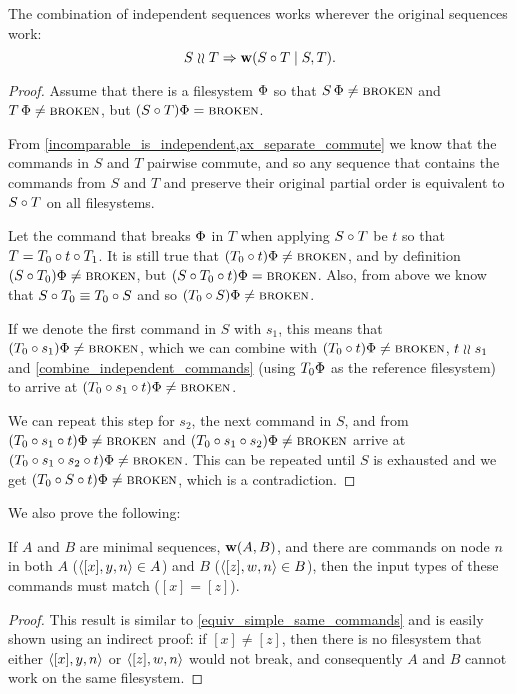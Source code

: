 \begin{mylem}\label{combine_independent_sequences}
The combination of independent sequences works wherever the original sequences work:
\[ S\mathrel{\wr\wr} T \Rightarrow \mathbf{w}({S\circ T}\mathrel{|}{S,T}). \]
\end{mylem}
\begin{proof}
Assume that there is a filesystem $\Phi$ so that
$S\,\Phi\neq\text{\normalfont\scshape{broken}}$ and $T\,\Phi\neq\text{\normalfont\scshape{broken}}$, but
$(S\circ T)\Phi=\text{\normalfont\scshape{broken}}$.

From \cref{incomparable_is_independent,ax_separate_commute} we know that
the commands in $S$ and $T$ pairwise commute, and so any sequence
that contains the commands from $S$ and $T$ and preserve their original partial order
is equivalent to $S\circ T$ on all filesystems.

Let the command that breaks $\Phi$ in $T$ when applying $S\circ T$ be $t$
so that $T=T_0\circ t\circ T_1$.
It is still true that $(T_0 \circ t)\Phi\neq\text{\normalfont\scshape{broken}}$,
and by definition $(S\circ T_0)\Phi\neq\text{\normalfont\scshape{broken}}$,
but $(S\circ T_0\circ t)\Phi=\text{\normalfont\scshape{broken}}$.
Also, from above we know that $S\circ T_0\equiv T_0\circ S$
and so $(T_0 \circ S)\Phi\neq\text{\normalfont\scshape{broken}}$.

If we denote the first command in $S$ with $s_1$,
this means that $(T_0 \circ s_1)\Phi\neq\text{\normalfont\scshape{broken}}$,
which we can combine with $(T_0 \circ t)\Phi\neq\text{\normalfont\scshape{broken}}$, $t\mathrel{\wr\wr} s_1$ and
\cref{combine_independent_commands}
(using $T_0\Phi$ as the reference filesystem)
to arrive at $(T_0 \circ s_1\circ t)\Phi\neq\text{\normalfont\scshape{broken}}$.

We can repeat this step for $s_2$, the next command in $S$,
and from 
$(T_0 \circ s_1\circ t)\Phi\neq\text{\normalfont\scshape{broken}}$
and
$(T_0 \circ s_1\circ s_2)\Phi\neq\text{\normalfont\scshape{broken}}$
arrive at
$(T_0 \circ s_1\circ s_2\circ t)\Phi\neq\text{\normalfont\scshape{broken}}$.
This can be repeated until $S$ is exhausted and we get
$(T_0 \circ S\circ t)\Phi\neq\text{\normalfont\scshape{broken}}$, which is a contradiction.
\end{proof}

We also prove the following:

\begin{mylem}\label{worksinputmatch}
If $A$ and $B$ are minimal sequences, $\mathbf{w}({A,B})$,
and there are commands on node $n$ in both $A$ ($\langle{[x],y,n}\rangle\in A$) and $B$ ($\langle{[z],w,n}\rangle\in B$),
then the input types of these commands must match ($[x]=[z]$).
\end{mylem}
\begin{proof}
This result is similar to \cref{equiv_simple_same_commands} and
is easily shown using an indirect proof: if $[x]\neq [z]$, then there is no filesystem that
either $\langle{[x],y,n}\rangle$ or $\langle{[z],w,n}\rangle$ would not break, 
and consequently $A$ and $B$ cannot work on the same filesystem.
\end{proof}


